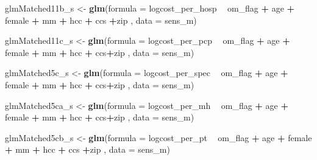 \documentclass[]{article}
\newenvironment{Shaded}{\begin{snugshade}}{\end{snugshade}}
\newcommand{\KeywordTok}[1]{\textcolor[rgb]{0.13,0.29,0.53}{\textbf{#1}}}
\newcommand{\DataTypeTok}[1]{\textcolor[rgb]{0.13,0.29,0.53}{#1}}
\newcommand{\StringTok}[1]{\textcolor[rgb]{0.31,0.60,0.02}{#1}}
\newcommand{\OperatorTok}[1]{\textcolor[rgb]{0.81,0.36,0.00}{\textbf{#1}}}
\newcommand{\NormalTok}[1]{#1}
\begin{document}
\begin{Shaded}
\begin{Highlighting}[]
\NormalTok{glmMatched11b_s <-}\StringTok{ }\KeywordTok{glm}\NormalTok{(}\DataTypeTok{formula =}\NormalTok{ logcost_per_hosp }\OperatorTok{~}\StringTok{ }\NormalTok{om_flag }\OperatorTok{+}\StringTok{ }\NormalTok{age }\OperatorTok{+}\StringTok{ }\NormalTok{female }\OperatorTok{+}\StringTok{ }\NormalTok{mm }\OperatorTok{+}\StringTok{ }\NormalTok{hcc }\OperatorTok{+}\StringTok{ }\NormalTok{ccs }\OperatorTok{+}\NormalTok{zip ,}
                     \DataTypeTok{data    =}\NormalTok{ sens_m)}

\NormalTok{glmMatched11c_s <-}\StringTok{ }\KeywordTok{glm}\NormalTok{(}\DataTypeTok{formula =}\NormalTok{ logcost_per_pcp }\OperatorTok{~}\StringTok{ }\NormalTok{om_flag }\OperatorTok{+}\StringTok{ }\NormalTok{age }\OperatorTok{+}\StringTok{ }\NormalTok{female }\OperatorTok{+}\StringTok{ }\NormalTok{mm }\OperatorTok{+}\StringTok{ }\NormalTok{hcc }\OperatorTok{+}\StringTok{ }\NormalTok{ccs}\OperatorTok{+}\NormalTok{zip  ,}
                     \DataTypeTok{data    =}\NormalTok{ sens_m)}


\NormalTok{glmMatched5c_s <-}\StringTok{ }\KeywordTok{glm}\NormalTok{(}\DataTypeTok{formula =}\NormalTok{ logcost_per_spec }\OperatorTok{~}\StringTok{ }\NormalTok{om_flag }\OperatorTok{+}\StringTok{ }\NormalTok{age }\OperatorTok{+}\StringTok{ }\NormalTok{female }\OperatorTok{+}\StringTok{ }\NormalTok{mm }\OperatorTok{+}\StringTok{ }\NormalTok{hcc }\OperatorTok{+}\StringTok{ }\NormalTok{ccs}\OperatorTok{+}\NormalTok{zip  ,}
                    \DataTypeTok{data    =}\NormalTok{ sens_m)}


\NormalTok{glmMatched5ca_s <-}\StringTok{ }\KeywordTok{glm}\NormalTok{(}\DataTypeTok{formula =}\NormalTok{ logcost_per_mh }\OperatorTok{~}\StringTok{ }\NormalTok{om_flag }\OperatorTok{+}\StringTok{ }\NormalTok{age }\OperatorTok{+}\StringTok{ }\NormalTok{female }\OperatorTok{+}\StringTok{ }\NormalTok{mm }\OperatorTok{+}\StringTok{ }\NormalTok{hcc }\OperatorTok{+}\StringTok{ }\NormalTok{ccs}\OperatorTok{+}\NormalTok{zip  ,}
                     \DataTypeTok{data    =}\NormalTok{ sens_m)}


\NormalTok{glmMatched5cb_s <-}\StringTok{ }\KeywordTok{glm}\NormalTok{(}\DataTypeTok{formula =}\NormalTok{ logcost_per_pt }\OperatorTok{~}\StringTok{ }\NormalTok{om_flag }\OperatorTok{+}\StringTok{ }\NormalTok{age }\OperatorTok{+}\StringTok{ }\NormalTok{female }\OperatorTok{+}\StringTok{ }\NormalTok{mm }\OperatorTok{+}\StringTok{ }\NormalTok{hcc }\OperatorTok{+}\StringTok{ }\NormalTok{ccs }\OperatorTok{+}\NormalTok{zip ,}
                     \DataTypeTok{data    =}\NormalTok{ sens_m)}




\end{Highlighting}
\end{Shaded}
\end{document}
